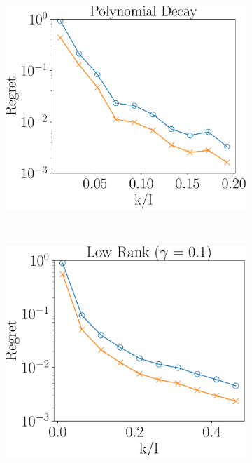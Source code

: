 \begin{figure}
	\begin{subfigure}{0.3\textwidth}
		\includegraphics[scale = 0.24]{figure/fig3_spd_400.pdf}
	\end{subfigure}\\
	\begin{subfigure}{0.3\textwidth}
		\includegraphics[scale = 0.24]{figure/fig3_lk_mnoise_400.pdf}
	\end{subfigure}
	\begin{subfigure}{0.55\textwidth}

\end{subfigure}
\end{figure}
